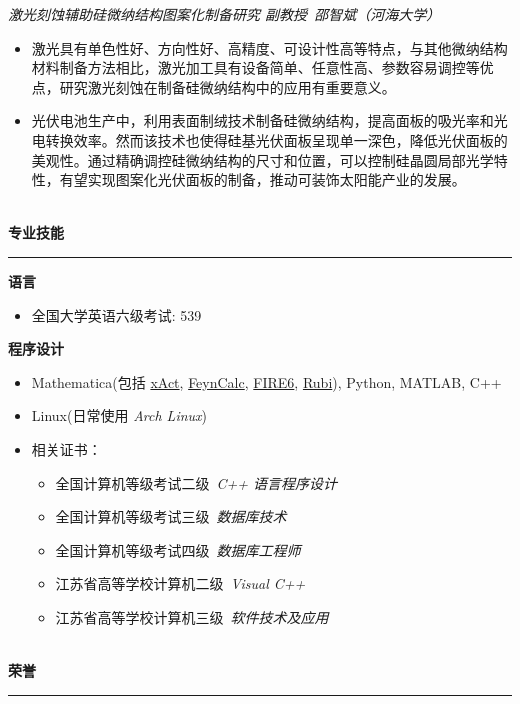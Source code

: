 \documentclass[12pt]{article}
\newcommand{\sect}[1]{
    ~\\ \noindent \textbf{#1} \medskip \hrule \medskip
}
\begin{document}
\smallskip \quad \textit{激光刻蚀辅助硅微纳结构图案化制备研究 \hfill 副教授\ 邵智斌（河海大学）}

\begin{itemize}[noitemsep,nolistsep]
    \item 激光具有单色性好、方向性好、高精度、可设计性高等特点，与其他微纳结构材料制备方法相比，激光加工具有设备简单、任意性高、参数容易调控等优点，研究激光刻蚀在制备硅微纳结构中的应用有重要意义。
    \item 光伏电池生产中，利用表面制绒技术制备硅微纳结构，提高面板的吸光率和光电转换效率。然而该技术也使得硅基光伏面板呈现单一深色，降低光伏面板的美观性。通过精确调控硅微纳结构的尺寸和位置，可以控制硅晶圆局部光学特性，有望实现图案化光伏面板的制备，推动可装饰太阳能产业的发展。
\end{itemize}


\sect{专业技能}

\textbf{语言}
\begin{itemize}[noitemsep,nolistsep]
    \item 全国大学英语六级考试: 539
\end{itemize}

\textbf{程序设计}
\begin{itemize}[noitemsep,nolistsep]
    \item Mathematica(包括 \href{http://xact.es/index.html}{xAct}, \href{https://feyncalc.github.io/}{FeynCalc}, \href{https://arxiv.org/abs/1901.07808}{FIRE6}, \href{https://rulebasedintegration.org/}{Rubi}), Python, MATLAB, C++
    \item Linux(日常使用 \textit{Arch Linux})
    \item 相关证书：\begin{itemize}[noitemsep,nolistsep]
              \item 全国计算机等级考试二级\ \textit{C++ 语言程序设计}
              \item 全国计算机等级考试三级\ \textit{数据库技术}
              \item 全国计算机等级考试四级\ \textit{数据库工程师}
              \item 江苏省高等学校计算机二级\ \textit{Visual C++}
              \item 江苏省高等学校计算机三级\ \textit{软件技术及应用}
          \end{itemize}
\end{itemize}


\sect{荣誉}
\end{document}
